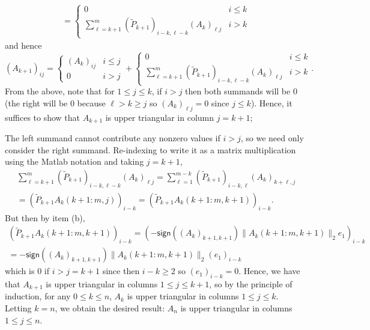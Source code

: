 \documentclass{../../../kin_math}
\begin{document}
\begin{questions}
\begin{enumerate}
\begin{solution}
\begin{multline*}
        = \begin{cases} 0 & i \leq k \\ \sum_{\ell = k + 1}^m (\tilde{P}_{k + 1})_{i - k, \ell - k} (A_k)_{\ell j} & i > k \end{cases}
      \end{multline*}
      and hence
      \begin{equation*}
        (A_{k + 1})_{ij} = \begin{cases} (A_k)_{ij} & i \leq j \\ 0 & i > j \end{cases} + \begin{cases} 0 & i \leq k \\ \sum_{\ell = k + 1}^m (\tilde{P}_{k + 1})_{i - k, \ell - k} (A_k)_{\ell j} & i > k \end{cases}.
      \end{equation*}
      From the above, note that for $1 \leq j \leq k$, if $i > j$ then both summands will be 0 (the right will be 0 because $\ell > k \geq j$ so $(A_k)_{\ell j} = 0$ since $j \leq k$). Hence, it suffices to show that $A_{k + 1}$ is upper triangular in column $j = k + 1$;

      The left summand cannot contribute any nonzero values if $i > j$, so we need only consider the right summand. Re-indexing to write it as a matrix multiplication using the Matlab notation and taking $j = k + 1$,
      \begin{multline*}
        \sum_{\ell = k + 1}^m (\tilde{P}_{k + 1})_{i - k, \ell - k} (A_k)_{\ell j} = \sum_{\ell = 1}^{m - k} (\tilde{P}_{k + 1})_{i - k, \ell} (A_k)_{k + \ell, j} \\
        = (\tilde{P}_{k + 1} A_k(k + 1 : m, j))_{i - k} = (\tilde{P}_{k + 1} A_k(k + 1 : m, k + 1))_{i - k}.
      \end{multline*}
      But then by item (b),
      \begin{multline*}
        (\tilde{P}_{k + 1} A_k(k + 1 : m, k + 1))_{i - k} = (-\textsf{sign}((A_k)_{k + 1, k + 1}) \lVert A_k(k + 1 : m, k + 1) \rVert_2 e_1)_{i - k} \\
        = -\textsf{sign}((A_k)_{k + 1, k + 1}) \lVert A_k(k + 1 : m, k + 1) \rVert_2 (e_1)_{i - k}
      \end{multline*}
      which is $0$ if $i > j = k + 1$ since then $i - k \geq 2$ so $(e_1)_{i - k} = 0$. Hence, we have that $A_{k + 1}$ is upper triangular in columns $1 \leq j \leq k + 1$, so by the principle of induction, for any $0 \leq k \leq n$, $A_k$ is upper triangular in columns $1 \leq j \leq k$. Letting $k = n$, we obtain the desired result: $A_n$ is upper triangular in columns $1 \leq j \leq n$.


\end{solution}
\end{enumerate}
\end{questions}
\end{document}
